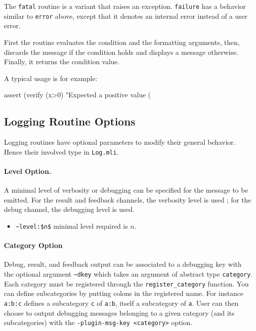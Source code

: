 \begin{description}
  The \lstinline{fatal} routine is a variant that raises an exception.
  \lstinline{failure} has a behavior similar to \lstinline{error} above,
  except that it denotes an internal error instead of a user error.

  First the routine evaluates the condition and the formatting
  arguments, then, discards the message if the condition holds and
  displays a message otherwise. Finally, it returns the condition value.

  A typical usage is for example:
  \begin{ocamlcode}
    assert (verify (x>0) "Expected a positive value (%
  \end{ocamlcode}

\end{description}

\subsection{Logging Routine Options}

Logging routines have optional parameters to modify their general
behavior. Hence their involved type in \texttt{Log.mli}.

\paragraph{Level Option.} A minimal level of verbosity or debugging can be
specified for the message to be emitted. For the result and feedback
channels, the verbosity level is used ; for the debug channel, the
debugging level is used.
\begin{itemize}
\item[] \lstinline{~level:$n$} minimal level required is $n$.
\end{itemize}

\paragraph{Category Option} Debug, result, and feedback
output can be associated to a debugging key with the optional argument
\lstinline{~dkey} which takes an argument of abstract type
\lstinline|category|.
Each category must be registered through the
\lstinline|register_category| function. You can define subcategories
by putting colons in the registered name. For instance \lstinline|a:b:c| defines
a subcategory \lstinline|c| of \lstinline|a:b|, itself a subcategory of 
\lstinline|a|. User can then choose to
output debugging messages belonging to a given category (and its subcategories)
with the \lstinline{-plugin-msg-key <category>} option. 

